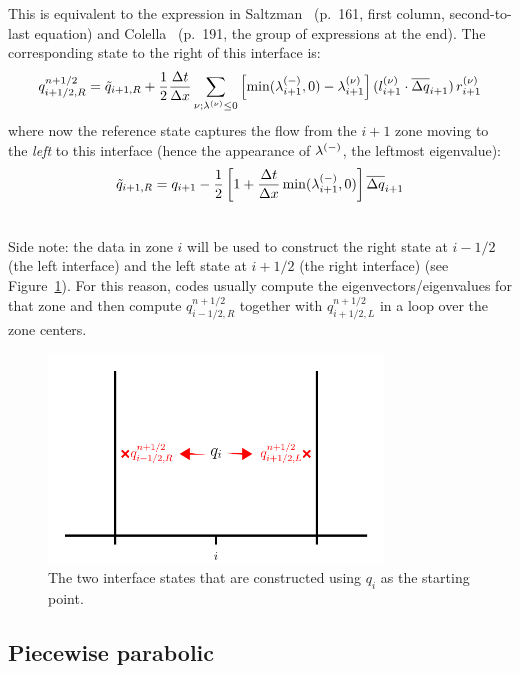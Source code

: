 This is equivalent to the expression in Saltzman~\cite{saltzman:1994}
(p.\ 161, first column, second-to-last equation) and
Colella~\cite{colella:1990} (p.\ 191, the group of expressions at the
end).  The corresponding state to the right of this interface is:
\begin{equation}
q_{i+1/2,R}^{n+1/2} = \tilde{q}_{i+1,R} + \frac{1}{2} \frac{\Delta t}{\Delta x}
       \sum_{\nu; \lambda^{(\nu)} \le 0}
       \left [ \min(\lambda_{i+1}^{(-)},0) - \lambda_{i+1}^{(\nu)} \right ]
       (l_{i+1}^{(\nu)} \cdot \overline{\Delta q}_{i+1}) \, r_{i+1}^{(\nu)}
\end{equation}
where now the reference state captures the flow from the $i+1$ zone
moving to the {\em left} to this interface (hence the appearance of
$\lambda^{(-)}$, the leftmost eigenvalue):
\begin{equation}
\tilde{q}_{i+1,R} = q_{i+1} - \frac{1}{2} \left [ 1 + \frac{\Delta t}{\Delta x} \min(\lambda_{i+1}^{(-)},0) \right ] \overline{\Delta q}_{i+1}
\end{equation}

\ \\

Side note: the data in zone $i$ will be used to construct the right
state at $i-1/2$ (the left interface) and the left state at $i+1/2$
(the right interface) (see Figure~\ref{fig:states}).  For this reason,
codes usually compute the eigenvectors/eigenvalues for that zone and
then compute $q_{i-1/2,R}^{n+1/2}$ together with $q_{i+1/2,L}^{n+1/2}$
in a loop over the zone centers.

\begin{figure}
\centering
\includegraphics[width=3.5in]{states}
\caption[The two interface states derived from a cell-center quantity]{\label{fig:states} The two interface states that are constructed
using $q_i$ as the starting point.}
\end{figure}

\subsection{Piecewise parabolic}

